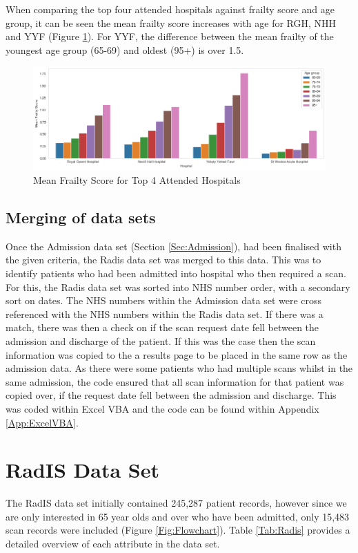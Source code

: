 \documentclass[../thesis.tex]{subfiles}
\begin{document}
When comparing the top four attended hospitals against frailty score and age group, it can be seen the mean frailty score increases with age for RGH, NHH and YYF (Figure \ref{Fig:MeanFrailty}). For YYF, the difference between the mean frailty of the youngest age group (65-69) and oldest (95+) is over 1.5.
\begin{figure}[H]
    \centering
    \includegraphics[width = \textwidth]{Chapter3/Figures/Mean Frailty for top four hospitals in ABUHB.png}
    \caption{Mean Frailty Score for Top 4 Attended Hospitals}
    \label{Fig:MeanFrailty}
\end{figure}

\subsection{Merging of data sets}
Once the Admission data set (Section \ref{Sec:Admission}), had been finalised with the given criteria, the Radis data set was merged to this data. This was to identify patients who had been admitted into hospital who then required a scan. For this, the Radis data set was sorted into NHS number order, with a secondary sort on dates. The NHS numbers within the Admission data set were cross referenced with the NHS numbers within the Radis data set. If there was a match, there was then a check on if the scan request date fell between the admission and discharge of the patient. If this was the case then the scan information was copied to the a results page to be placed in the same row as the admission data. As there were some patients who had multiple scans whilst in the same admission, the code ensured that all scan information for that patient was copied over, if the request date fell between the admission and discharge. This was coded within Excel VBA and the code can be found within Appendix \ref{App:ExcelVBA}.

\section{RadIS Data Set}\label{Sec:Radis}
The RadIS data set initially contained 245,287 patient records, however since we are only interested in 65 year olds and over who have been admitted, only 15,483 scan records were included (Figure \ref{Fig:Flowchart}). Table \ref{Tab:Radis} provides a detailed overview of each attribute in the data set.
\end{document}
